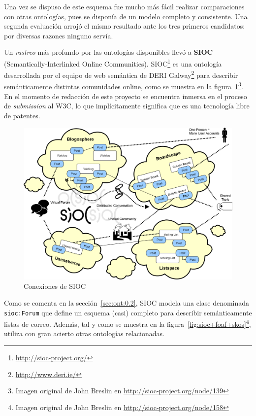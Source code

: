 Una vez se dispuso de este esquema fue mucho más fácil realizar comparaciones
con otras ontologías, pues se disponía de un modelo completo y consistente. Una 
segunda evaluación arrojó el mismo resultado ante los tres primeros candidatos:
por diversas razones ninguno servía.

Un \emph{rastreo} más profundo por las ontologías disponibles llevó a 
\textbf{SIOC}\cite{Breslin2005} (Semantically-Interlinked Online Communities). 
SIOC\footnote{\url{http://sioc-project.org/}} es una ontología desarrollada 
por el equipo de web semántica de DERI Galway\footnote{\url{http://www.deri.ie/}} 
para describir semánticamente distintas comunidades online, como se muestra en
la figura~\ref{fig:siocCloud}\footnote{Imagen original de John Breslin en 
\url{http://sioc-project.org/node/139}}. En el momento de redacción
de este proyecto se encuentra inmersa en el proceso de \emph{submission} al
W3C, lo que implícitamente significa que es una tecnología libre de patentes.

\begin{figure}[H]
	\centering
	\includegraphics[width=12cm]{images/sioc-clouds.png}
	\caption{Conexiones de SIOC}
	\label{fig:siocCloud}
\end{figure}

Como se comenta en la sección~\ref{sec:ont:0.2}, SIOC modela una clase denominada
\texttt{sioc:Forum} que define un esquema (casi) completo para describir
semánticamente listas de correo. Además, tal y como se muestra en la 
figura~\ref{fig:sioc+foaf+skos}\footnote{Imagen original de John Breslin en 
\url{http://sioc-project.org/node/158}}, utiliza con gran acierto otras ontologías 
relacionadas.


